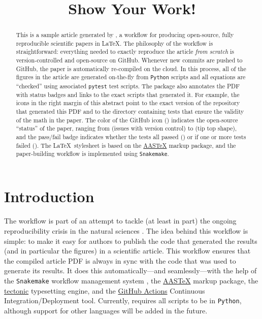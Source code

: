\documentclass[modern]{aastex62}
\begin{document}
\title{Show Your Work!}

\author[\myORCID]{\myName}
\email{\myEmail}
\affil{\myAffil}

\begin{abstract}
    This is a sample article generated by \showyourwork, a workflow for producing open-source, fully reproducible scientific papers in \LaTeX.
    The philosophy of the workflow is straightforward: everything needed to exactly reproduce the article \emph{from scratch} is version-controlled and open-source on GitHub.
    Whenever new commits are pushed to GitHub, the paper is automatically re-compiled on the cloud.
    In this process, all of the figures in the article are generated on-the-fly from \texttt{Python} scripts and all equations are ``checked'' using associated \texttt{pytest} test scripts.
    The \showyourwork package also annotates the PDF with status badges and links to the exact scripts that generated it.
    For example, the icons in the right margin of this abstract point to the exact version of the repository that generated this PDF and to the directory containing tests that ensure the validity of the math in the paper.
    The color of the GitHub icon (\GitHubIcon) indicates the open-source ``status'' of the paper, ranging from \GitHubIconRed (issues with version control) to \GitHubIconBlue (tip top shape), and the pass/fail badge indicates whether the tests all passed (\TestPassIcon) or if one or more tests failed (\TestFailIcon).
    The \LaTeX\, stylesheet is based on the \href{https://journals.aas.org/aastex-package-for-manuscript-preparation/}{AASTeX} markup package, and the paper-building workflow is implemented using \texttt{Snakemake}.
\end{abstract}

\section{Introduction}

The \showyourwork workflow is part of an attempt to tackle (at least in part) the ongoing reproducibility crisis in the natural sciences \citep[see, e.g.,][]{Baker2016}.
The idea behind this workflow is simple: to make it easy for authors to publish the code that generated the results (and in particular the figures) in a scientific article.
This workflow ensures that the compiled article PDF is always in sync with the code that was used to generate its results.
It does this automatically---and seamlessly---with the help of the \texttt{Snakemake} workflow management system \citep{Molder2021}, the \href{https://journals.aas.org/aastex-package-for-manuscript-preparation/}{AASTeX} markup package, the \href{https://github.com/tectonic-typesetting/tectonic}{tectonic} typesetting engine, and the \href{https://github.com/features/actions}{GitHub Actions} Continuous Integration/Deployment tool. Currently, \showyourwork requires all scripts to be in \texttt{Python}, although support for other languages will be added in the future.
\end{document}
